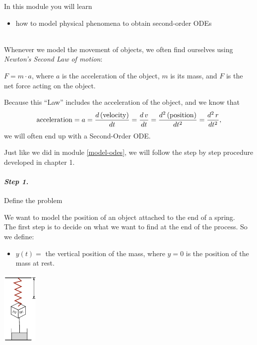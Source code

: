 In this module you will learn
\begin{itemize}
	\item how to model physical phenomena to obtain second-order ODEs
\end{itemize}

\hfill \\


Whenever we model the movement of objects, we often find ourselves using \emph{Newton's Second Law of motion}:

\begin{definition}
	$F = m \cdot a$, \quad
	where $a$ is the acceleration of the object, $m$ is its mass, and $F$ is the net force acting on the object.
\end{definition}

Because this ``Law'' includes the acceleration of the object, and we know that
$$
{\rm acceleration} = a = \frac{d\,({\rm velocity})}{dt} = \frac{d\,v}{dt} = \frac{d^2 \, ({\rm position})}{dt^2} = \frac{d^2\,r}{dt^2},
$$
we will often end up with a Second-Order ODE.

Just like we did in module \ref{model-odes}, we will follow the step by step procedure developed in chapter 1.

\paragraph{\emph{Step 1.}} Define the problem

\begin{example}

\begin{minipage}{.75\textwidth}
We want to model the position of an object attached to the end of a spring. \\

The first step is to decide on what we want to find at the end of the process. 
So we define:
\begin{itemize}
	\item $y(t) =$ the vertical position of the mass, where $y=0$ is the position of the mass at rest.
\end{itemize}
\end{minipage}
\hfill
\begin{minipage}{44pt}
\includegraphics*[height=100pt]{images/module16-spring-mass-dashpot.pdf}	
\end{minipage}
\end{example}


